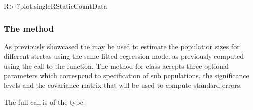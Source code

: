 \documentclass[
]{jss}
\newcommand{\1}{\mathcal{I}} \newcommand{\bx}{\boldsymbol{x}}
\begin{document}
\begin{CodeChunk}
\begin{CodeInput}
R> ?plot.singleRStaticCountData
\end{CodeInput}
\end{CodeChunk}

\subsubsection[The stratifyPopsize method]{The 
method}\label{the-method}

As previously showcased the  may be used to
estimate the population sizes for different stratas using the same
fitted regression model as previously computed using the call to the
 function. The method for
 class accepts three optional parameters
 which correspond to specification of sub
populations, the significance levels and the covariance matrix that will
be used to compute standard errors.

The full call is of the type: \footnotesize
\end{document}
